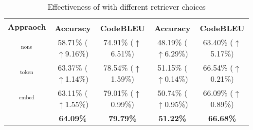 \begin{table*}[t]
\footnotesize
    \centering
    \caption{Effectiveness of {\toolname} with different retriever choices}

    \begin{tabular}{c|cc|c|c}
    \toprule
    \multirow{2}[4]{*}{\textbf{Appraoch}} & \multicolumn{2}{c|}{\olddata{}} & \multicolumn{2}{c}{\newdata{}} \\
\cmidrule{2-5}          & \textbf{Accuracy} & \textbf{CodeBLEU} & \multicolumn{1}{c}{\textbf{Accuracy}} & \textbf{CodeBLEU} \\
    \midrule
    \toolname{}$_\text{none}$  & 58.71\% ($\uparrow$9.16\%) & 74.91\% ($\uparrow$6.51\%) & 48.19\% ($\uparrow$6.29\%) & 63.40\% ($\uparrow$5.17\%) \\
    \toolname{}$_\text{token}$ & 63.37\% ($\uparrow$1.14\%) & 78.54\% ($\uparrow$1.59\%) & 51.15\% ($\uparrow$0.14\%) & 66.54\% ($\uparrow$0.21\%) \\
    \toolname{}$_\text{embed}$ & 63.11\% ($\uparrow$1.55\%) & 79.01\% ($\uparrow$0.99\%) & 50.74\% ($\uparrow$0.95\%) & 66.09\% ($\uparrow$0.89\%) \\
    \midrule
    \toolname{} & \textbf{64.09\%} & \textbf{79.79\%} & \multicolumn{1}{c}{\textbf{51.22\%}} & \textbf{66.68\%} \\
    \bottomrule
    \end{tabular}%

    \label{tab:rq2}
\end{table*}


